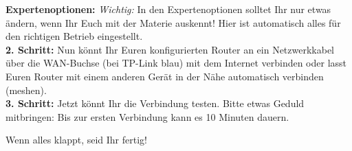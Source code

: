 \documentclass[10pt]{extarticle}
\begin{document}
\begin{multicols}{2}
\textbf{Expertenoptionen:} \textit{Wichtig:} In den Expertenoptionen solltet Ihr nur etwas ändern, wenn Ihr Euch mit der Materie auskennt! Hier ist automatisch alles für den richtigen Betrieb eingestellt.\\

\textbf{2. Schritt:} Nun könnt Ihr Euren konfigurierten Router an ein Netzwerkkabel über die WAN-Buchse (bei TP-Link blau) mit dem Internet verbinden oder lasst Euren Router mit einem anderen Gerät in der Nähe automatisch verbinden (meshen). \\

\textbf{3. Schritt:} Jetzt könnt Ihr die Verbindung testen. Bitte etwas Geduld mitbringen: Bis zur ersten Verbindung kann es 10 Minuten dauern. \\


\vfill

Wenn alles klappt, seid Ihr fertig!
\end{multicols}
\end{document}
